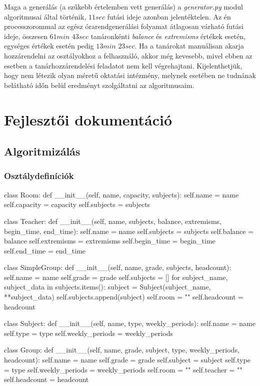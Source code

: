 \documentclass[12pt,a4paper]{report}
\begin{document}
Maga a generálás (a szűkebb értelemben vett generálás) a \textit{generator.py} modul algoritmusai által történik, $11 sec$ futási ideje azonban jelentéktelen. Az én processzorommal az egész órarendgenerálási folyamat átlagosan várható futási ideje, összesen $61min$ $43sec$ tanáronkénti \textit{balance} és \textit{extremisms} értékek esetén, egységes értékek esetén pedig $13min$ $23sec$. Ha a tanárokat manuálisan akarja hozzárendelni az osztályokhoz a felhasználó, akkor még kevesebb, mivel ebben az esetben a tanárhozzárendelési feladatot nem kell végrehajtani. Kijelenthetjük, hogy nem létezik olyan méretű oktatási intézmény, melynek esetében ne tudnának belátható időn belül eredményt szolgáltatni az algoritmusaim.

\newpage

\chapter{Fejlesztői dokumentáció}

\section{Algoritmizálás}

\subsection{Osztálydefiníciók}

\begin{python}
class Room:
    def __init__(self, name, capacity, subjects):
        self.name = name
        self.capacity = capacity
        self.subjects = subjects


class Teacher:
    def __init__(self, name, subjects, balance, extremisms, begin_time,
                 end_time):
        self.name = name
        self.subjects = subjects
        self.balance = balance
        self.extremisms = extremisms
        self.begin_time = begin_time
        self.end_time = end_time


class SimpleGroup:
    def __init__(self, name, grade, subjects, headcount):
        self.name = name
        self.grade = grade
        self.subjects = []
        for subject_name, subject_data in subjects.items():
            subject = Subject(subject_name, **subject_data)
            self.subjects.append(subject)
        self.room = ""
        self.headcount = headcount


class Subject:
    def __init__(self, name, type, weekly_periods):
        self.name = name
        self.type = type
        self.weekly_periods = weekly_periods


class Group:
    def __init__(self, name, grade, subject, type, weekly_periods,
                 headcount):
        self.name = name
        self.grade = grade
        self.subject = subject
        self.type = type
        self.weekly_periods = weekly_periods
        self.room = ""
        self.teacher = ""
        self.headcount = headcount
\end{python}
\end{document}
